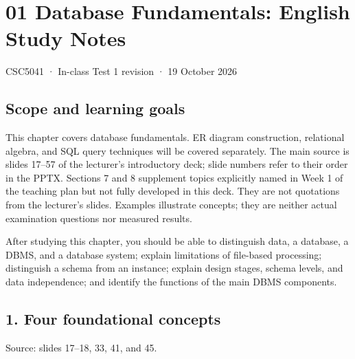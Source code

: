 \clearpage
\section{01 Database Fundamentals: English Study Notes}\label{01_database_fundamentals_en}

CSC5041 · In-class Test 1 revision · 19 October 2026

\subsection{Scope and learning goals}\label{01_database_fundamentals_en-scope-and-learning-goals}

This chapter covers database fundamentals. ER diagram construction, relational algebra, and SQL query techniques will be covered separately. The main source is slides 17--57 of the lecturer's introductory deck; slide numbers refer to their order in the PPTX. Sections 7 and 8 supplement topics explicitly named in Week 1 of the teaching plan but not fully developed in this deck. They are not quotations from the lecturer's slides. Examples illustrate concepts; they are neither actual examination questions nor measured results.

After studying this chapter, you should be able to distinguish data, a database, a DBMS, and a database system; explain limitations of file-based processing; distinguish a schema from an instance; explain design stages, schema levels, and data independence; and identify the functions of the main DBMS components.

\subsection{1. Four foundational concepts}\label{01_database_fundamentals_en-four-foundational-concepts}

Source: slides 17--18, 33, 41, and 45.

